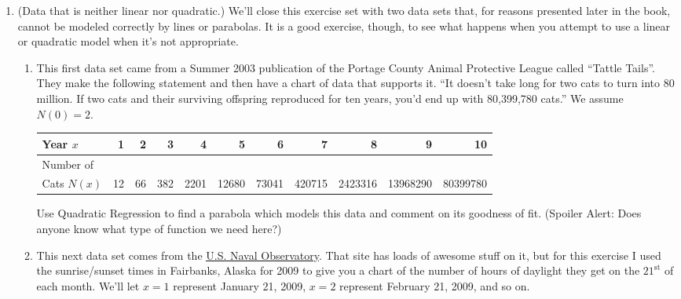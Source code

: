 \begin{enumerate}
\begin{enumerate}
\end{enumerate}

\item (Data that is neither linear nor quadratic.)  We'll close this exercise set with two data sets that, for reasons presented later in the book, cannot be modeled correctly by lines or parabolas.  It is a good exercise, though, to see what happens when you attempt to use a linear or quadratic model when it's not appropriate.

\begin{enumerate}

\item \label{APLcats} This first data set came from a Summer 2003 publication of the Portage County Animal Protective League called ``Tattle Tails''.  They make the following statement and then have a chart of data that supports it. ``It doesn't take long for two cats to turn into 80 million.  If two cats and their surviving offspring reproduced for ten years, you'd end up with 80,399,780 cats.''  We assume $N(0) = 2$.

\medskip

\scriptsize

\noindent \begin{tabular}{|l|r|r|r|r|r|r|r|r|r|r|} \hline
Year $x$ & 1 & 2 & 3 & 4 & 5 & 6 & 7 & 8 & 9 & 10 \\ 
\hline 
Number of  & & & & & & & & & & \\
Cats $N(x)$ & 12 & 66 & 382 & 2201 & 12680 & 73041 & 420715 & 2423316 & 13968290 & 80399780 \\ \hline
\end{tabular}

\normalsize

\medskip

\noindent Use Quadratic Regression to find a parabola which models this data and comment on its goodness of fit. (Spoiler Alert: Does anyone know what type of function we need here?)

\medskip

\item \label{regsunlight} This next data set comes from the \href{http://aa.usno.navy.mil/data/docs/RS_OneYear.php}{\underline{U.S. Naval Observatory}}.  That site has loads of awesome stuff on it, but for this exercise I used the sunrise/sunset times in Fairbanks, Alaska for 2009 to give you a chart of the number of hours of daylight they get on the $21^{\mbox{st}}$ of each month.  We'll let $x = 1$ represent January 21, 2009, $x = 2$ represent February 21, 2009, and so on.


\end{enumerate}
\end{enumerate}
